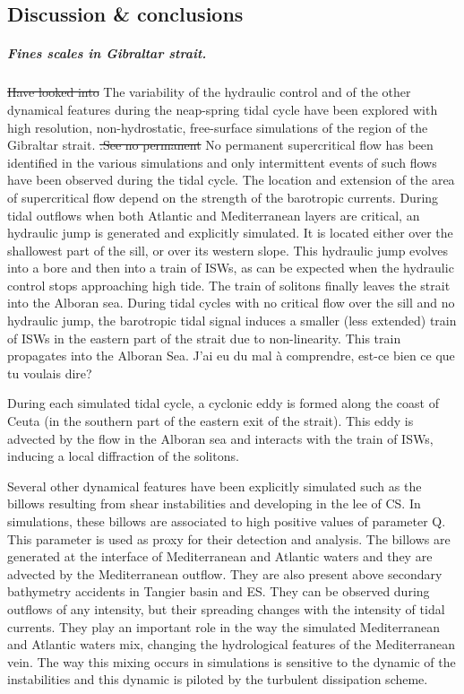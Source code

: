 \subsection{Discussion \& conclusions}
\color{blue}\subparagraph{Fines scales in Gibraltar strait.}
\sout{Have looked into} The variability of the hydraulic control and of the other dynamical features during the neap-spring tidal cycle have been explored with high resolution, non-hydrostatic, free-surface simulations of the region of the Gibraltar strait. \sout{.See no permanent} No permanent supercritical flow has been identified in the various simulations and only intermittent events of such flows have been observed during the tidal cycle. The location and extension of the area of supercritical flow depend on the strength of the barotropic currents. \color{black}
\color{blue}During tidal outflows when both Atlantic and Mediterranean layers are critical, an hydraulic jump is generated and explicitly simulated. It is located \color{black} either over the shallowest part of the sill, or over its western slope.  \color{blue}This hydraulic jump evolves into a bore and then into a train of ISWs, as can be expected when the hydraulic control stops approaching high tide. The train of solitons finally leaves the strait into the Alboran sea. 
During tidal cycles with no critical flow over the sill and no hydraulic jump, the barotropic tidal signal induces a smaller (less extended) train of ISWs in the eastern part of the strait due to non-linearity. This train propagates into the Alboran Sea.  \color{green}J'ai eu du mal à comprendre, est-ce bien ce que tu voulais dire? \color{black}

 \color{blue}During \color{black} each simulated tidal cycle, a cyclonic eddy is formed along the coast of Ceuta (in the southern part of the eastern exit of the strait). This eddy is advected by the flow in the Alboran sea and interacts with the train of ISWs, \color{blue}inducing a local diffraction of the solitons. \color{black}


\color{blue}Several other dynamical features have been explicitly simulated such as the billows resulting from shear instabilities and developing\color{black} in the lee of CS. In simulations, these billows are associated to high positive values of parameter Q. This parameter is used as proxy for their detection and analysis. The billows are generated at the interface of \color{blue} Mediterranean and Atlantic waters and they are advected by the Mediterranean outflow. They are also present above secondary bathymetry accidents in Tangier basin and ES. They can be observed during outflows of any intensity, but their spreading changes with the intensity of tidal currents. They play an important role in the way the simulated Mediterranean and Atlantic waters mix, changing the hydrological features of the Mediterranean vein. The way this mixing occurs in simulations is sensitive to the dynamic of the instabilities and this dynamic is piloted by the turbulent dissipation scheme. \color{black}

